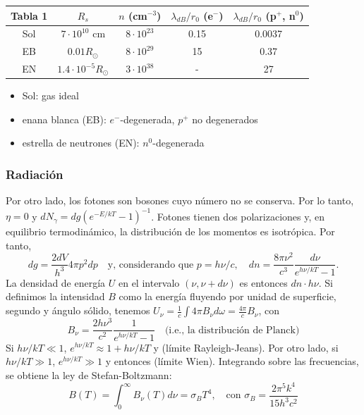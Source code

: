 \documentclass[11pt,letterpaper]{article}
\begin{document}
\begin{table}[H]
\centering
\renewcommand{\arraystretch}{1.5}
\begin{tabular}{|c|c|c|c|c|}
\hline
\textbf{Tabla 1} & \textbf{\(R_s\)} & \textbf{\(n\) (cm\(^{-3}\))} & \textbf{\(\lambda_{dB}/r_0\) (e\(^-\))} & \textbf{\(\lambda_{dB}/r_0\) (p\(^+\), n\(^0\))} \\ \hline
Sol & \(7 \cdot 10^{10}\) cm & \(8 \cdot 10^{23}\) & 0.15 & 0.0037 \\ \hline
EB & \(0.01 R_\odot\) & \(8 \cdot 10^{29}\) & 15 & 0.37 \\ \hline
EN & \(1.4 \cdot 10^{-5} R_\odot\) & \(3 \cdot 10^{38}\) & - & 27 \\ \hline
\end{tabular}
\end{table}

\begin{itemize}
    \item Sol: gas ideal
    \item enana blanca (EB): \(e^-\)-degenerada, \(p^+\) no degenerados
    \item estrella de neutrones (EN): \(n^0\)-degenerada
\end{itemize}

\subsubsection{Radiación}

Por otro lado, los fotones son bosones cuyo número no se conserva. Por lo tanto, \(\eta = 0\) y \(dN_\gamma = dg(e^{-E/kT}-1)^{-1}\). Fotones tienen dos polarizaciones y, en equilibrio termodinámico, la distribución de los momentos es isotrópica. Por tanto,
\begin{equation}
    dg = \frac{2dV}{h^3} 4\pi p^2 dp \quad \text{y, considerando que } p = h\nu/c, \quad dn = \frac{8\pi \nu^2}{c^3} \frac{d\nu}{e^{h\nu/kT} - 1}.
\end{equation}
La densidad de energía \(U\) en el intervalo \((\nu, \nu+d\nu)\) es entonces \(dn \cdot h\nu\). Si definimos la intensidad \(B\) como la energía fluyendo por unidad de superficie, segundo y ángulo sólido, tenemos \(U_\nu = \frac{1}{c} \int 4\pi B_\nu d\omega = \frac{4\pi}{c} B_\nu\), con
\begin{equation}
    B_\nu = \frac{2h\nu^3}{c^2} \frac{1}{e^{h\nu/kT} - 1} \quad \text{(i.e., la distribución de Planck)}
\end{equation}
Si \(h\nu/kT \ll 1\), \(e^{h\nu/kT} \approx 1 + h\nu/kT\) y (límite Rayleigh-Jeans). Por otro lado, si \(h\nu/kT \gg 1\), \(e^{h\nu/kT} \gg 1\) y entonces (límite Wien). Integrando sobre las frecuencias, se obtiene la ley de Stefan-Boltzmann: 
\begin{equation}
    B(T) = \int_0^\infty B_\nu(T) d\nu = \sigma_B T^4, \quad \text{con } \sigma_B = \frac{2\pi^5 k^4}{15 h^3 c^2}
\end{equation}
\end{document}
